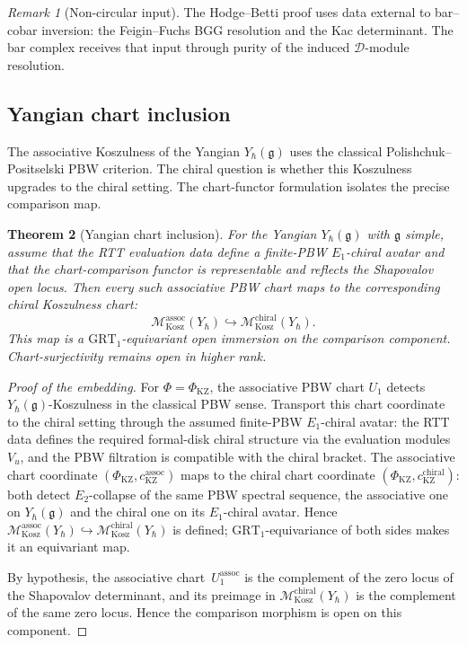 \documentclass[11pt,reqno]{amsart}
\newtheorem{theorem}{Theorem}[section]
\theoremstyle{definition}
\theoremstyle{remark}
\newtheorem{remark}[theorem]{Remark}
\newcommand{\cD}{\mathcal{D}}
\newcommand{\cM}{\mathcal{M}}
\newcommand{\fg}{\mathfrak{g}}
\newcommand{\Etwo}{E_2}
\newcommand{\Eone}{E_1}
\numberwithin{equation}{section}
\begin{document}
\begin{remark}[Non-circular input]
\label{rem:fm197-closed}
The Hodge--Betti proof uses data external to bar--cobar inversion:
the Feigin--Fuchs BGG resolution and the Kac determinant. The bar
complex receives that input through purity of the induced
$\cD$-module resolution.
\end{remark}

\subsection{Yangian chart inclusion}

The associative Koszulness of the Yangian $Y_\hbar(\fg)$
uses the classical Polishchuk--Positselski PBW criterion. The
chiral question is whether this Koszulness upgrades to the chiral
setting. The chart-functor formulation isolates the precise
comparison map.

\begin{theorem}[Yangian chart inclusion]
\label{thm:yangian-chart-inclusion}
For the Yangian $Y_\hbar(\fg)$ with $\fg$ simple, assume that the
RTT evaluation data define a finite-PBW \(\Eone\)-chiral avatar and
that the chart-comparison functor is representable and reflects the
Shapovalov open locus. Then every such associative PBW chart maps to
the corresponding chiral Koszulness chart:
\[
\cM_{\mathrm{Kosz}}^{\mathrm{assoc}}(Y_\hbar)
\hookrightarrow
\cM_{\mathrm{Kosz}}^{\mathrm{chiral}}(Y_\hbar).
\]
This map is a $\mathrm{GRT}_1$-equivariant open immersion on the
comparison component. Chart-surjectivity remains open in higher
rank.
\end{theorem}

\begin{proof}[Proof of the embedding]
For $\Phi = \Phi_{\mathrm{KZ}}$, the associative PBW chart $U_1$
detects $Y_\hbar(\fg)$-Koszulness in the classical PBW sense.
Transport this chart coordinate to the chiral setting through the
assumed finite-PBW $\Eone$-chiral avatar: the RTT data defines the
required formal-disk chiral structure via the evaluation modules
$V_u$, and the PBW filtration is compatible with the chiral bracket.
The associative chart coordinate
$(\Phi_{\mathrm{KZ}}, c^{\mathrm{assoc}}_{\mathrm{KZ}})$ maps to
the chiral chart coordinate
$(\Phi_{\mathrm{KZ}}, c^{\mathrm{chiral}}_{\mathrm{KZ}})$: both
detect $\Etwo$-collapse of the same PBW spectral sequence, the
associative one on $Y_\hbar(\fg)$ and the chiral one on its
$\Eone$-chiral avatar. Hence
$\cM_{\mathrm{Kosz}}^{\mathrm{assoc}}(Y_\hbar) \hookrightarrow
 \cM_{\mathrm{Kosz}}^{\mathrm{chiral}}(Y_\hbar)$
is defined; $\mathrm{GRT}_1$-equivariance of both sides makes it
an equivariant map.

By hypothesis, the associative chart~$U_1^{\mathrm{assoc}}$ is the
complement of the zero locus of the Shapovalov determinant, and its
preimage in $\cM_{\mathrm{Kosz}}^{\mathrm{chiral}}(Y_\hbar)$ is the
complement of the same zero locus. Hence the comparison morphism is
open on this component.
\end{proof}
\end{document}
